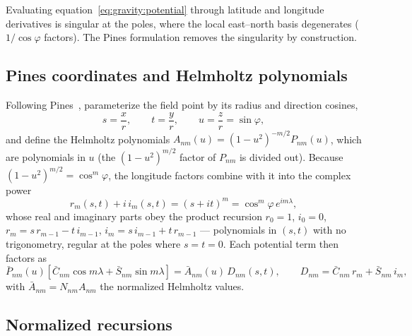 Evaluating equation~\eqref{eq:gravity:potential} through latitude and
longitude derivatives is singular at the poles, where the local
east--north basis degenerates ($1/\cos\varphi$ factors). The Pines
formulation removes the singularity by construction.

\subsection{Pines coordinates and Helmholtz polynomials}

Following Pines~\cite{pines1973}, parameterize the field point by its
radius and direction cosines,
\begin{equation}
  s = \frac{x}{r}, \qquad t = \frac{y}{r}, \qquad u = \frac{z}{r}
    = \sin\varphi,
  \label{eq:gravity:pines}
\end{equation}
and define the Helmholtz polynomials
$A_{nm}(u) = (1 - u^2)^{-m/2} P_{nm}(u)$, which are polynomials in $u$
(the $(1-u^2)^{m/2}$ factor of $P_{nm}$ is divided out). Because
$(1 - u^2)^{m/2} = \cos^m\varphi$, the longitude factors combine with
it into the complex power
\begin{equation}
  r_m(s, t) + i\, i_m(s, t) = (s + i t)^m
    = \cos^m\varphi\, e^{i m \lambda},
  \label{eq:gravity:rmim}
\end{equation}
whose real and imaginary parts obey the product recursion $r_0 = 1$,
$i_0 = 0$, $r_m = s\, r_{m-1} - t\, i_{m-1}$,
$i_m = s\, i_{m-1} + t\, r_{m-1}$ --- polynomials in $(s, t)$ with no
trigonometry, regular at the poles where $s = t = 0$. Each potential
term then factors as
\begin{equation}
  \bar{P}_{nm}(u)\left[\bar{C}_{nm}\cos m\lambda
    + \bar{S}_{nm}\sin m\lambda\right]
  = \bar{A}_{nm}(u)\, D_{nm}(s,t), \qquad
  D_{nm} = \bar{C}_{nm}\, r_m + \bar{S}_{nm}\, i_m,
  \label{eq:gravity:dnm}
\end{equation}
with $\bar{A}_{nm} = N_{nm} A_{nm}$ the normalized Helmholtz values.

\subsection{Normalized recursions}

